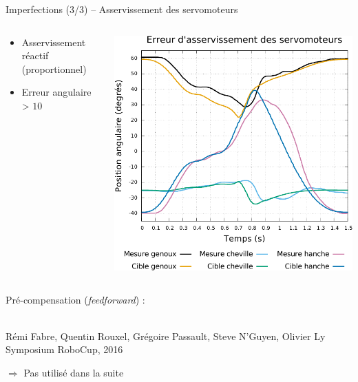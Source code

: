 \begin{frame}{Imperfections (3/3) -- Asservissement des servomoteurs}
    \begin{columns}
        \begin{column}{0.5\linewidth}
            \begin{itemize}
                \item Asservissement réactif (proportionnel)
                \item Erreur angulaire > $10$\degres
            \end{itemize}
        \end{column}
        \begin{column}{0.5\linewidth}
            \centering
            \includegraphics[type=pdf,ext=.pdf,read=.pdf,width=0.9\linewidth]{../plot/motors_control}
        \end{column}
    \end{columns}
    Pré-compensation (\textit{feedforward}) :
    \begin{block}{}
        \\
        \scriptsize
        Rémi Fabre, Quentin Rouxel, Grégoire Passault, Steve N'Guyen, Olivier Ly\\
        Symposium RoboCup, 2016\\
    \end{block}
    $\Rightarrow$ Pas utilisé dans la suite
\end{frame}

